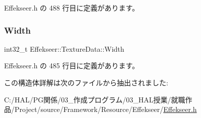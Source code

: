  Effekseer.\+h の 488 行目に定義があります。

\mbox{\label{struct_effekseer_1_1_texture_data_ab1391055f7b4bf482c89469de1061e08}} 
\subsubsection{\texorpdfstring{Width}{Width}}
{\footnotesize\ttfamily int32\+\_\+t Effekseer\+::\+Texture\+Data\+::\+Width}



 Effekseer.\+h の 485 行目に定義があります。



この構造体詳解は次のファイルから抽出されました\+:\begin{DoxyCompactItemize}
\item 
C\+:/\+H\+A\+L/\+P\+G関係/03\+\_\+作成プログラム/03\+\_\+\+H\+A\+L授業/就職作品/\+Project/source/\+Framework/\+Resource/\+Effekseer/\mbox{\hyperlink{_effekseer_8h}{Effekseer.\+h}}\end{DoxyCompactItemize}
